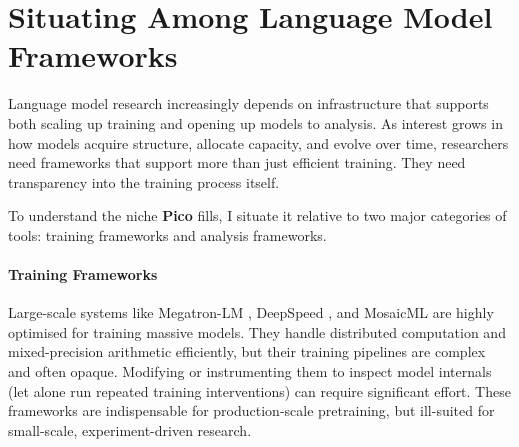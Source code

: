 \section[Situating \picomed Among Language Model Frameworks]{Situating \picolarge Among Language Model Frameworks}
\label{sec:pico-related}

Language model research increasingly depends on infrastructure that supports both scaling up training and opening up models to analysis. As interest grows in how models acquire structure, allocate capacity, and evolve over time, researchers need frameworks that support more than just efficient training. They need transparency into the training process itself.

To understand the niche \textbf{Pico} fills, I situate it relative to two major categories of tools: training frameworks and analysis frameworks.


\paragraph{Training Frameworks}
Large-scale systems like Megatron-LM \citep{narayanan2021megatron}, DeepSpeed \citep{rasley2020deepspeed}, and MosaicML \citep{mosaic2023mpt} are highly optimised for training massive models. They handle distributed computation and mixed-precision arithmetic efficiently, but their training pipelines are complex and often opaque. Modifying or instrumenting them to inspect model internals (let alone run repeated training interventions) can require significant effort. These frameworks are indispensable for production-scale pretraining, but ill-suited for small-scale, experiment-driven research.

